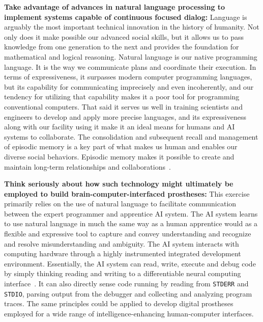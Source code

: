 
{\bf{Take advantage of advances in natural language processing to implement systems capable of continuous focused dialog:}} Language is arguably the most important technical innovation in the history of humanity. Not only does it make possible our advanced social skills, but it allows us to pass knowledge from one generation to the next and provides the foundation for mathematical and logical reasoning. Natural language is our native programming language. It is the way we communicate plans and coordinate their execution. In terms of expressiveness, it surpasses modern computer programming languages, but its capability for communicating imprecisely and even incoherently, and our tendency for utilizing that capability makes it a poor tool for programming conventional computers. That said it serves us well in training scientists and engineers to develop and apply more precise languages, and its expressiveness along with our facility using it make it an ideal means for humans and AI systems to collaborate. The consolidation and subsequent recall and management of episodic memory is a key part of what makes us human and enables our diverse social behaviors. Episodic memory makes it possible to create and maintain long-term relationships and collaborations~\cite{PritzeletalICML-17,MoscovitchetalARP-16,OReillyetalCS-15}.


{\bf{Think seriously about how such technology might ultimately be employed to build brain-computer-interfaced prostheses:}} This exercise primarily relies on the use of natural language to facilitate communication between the expert programmer and apprentice AI system. The AI system learns to use natural language in much the same way as a human apprentice would \emdash{} as a flexible and expressive tool to capture and convey understanding and recognize and resolve misunderstanding and ambiguity. The AI system interacts with computing hardware through a highly instrumented integrated development environment. Essentially, the AI system can read, write, execute and debug code by simply thinking \emdash{} reading and writing to a differentiable neural computing interface~\cite{GravesetalNATURE-16}. It can also directly sense code running by reading from {\tt{STDERR}} and {\tt{STDIO}}, parsing output from the debugger and collecting and analyzing program traces. The same principles could be applied to develop digital prostheses employed for a wide range of intelligence-enhancing human-computer interfaces.

